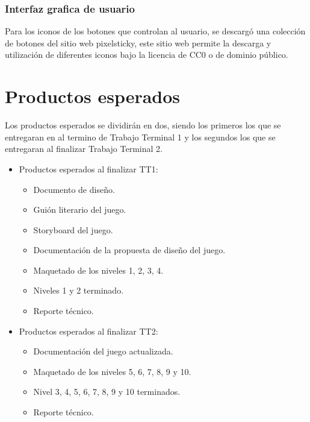 	\subsubsection{Interfaz grafica de usuario}
Para los iconos de los botones que controlan al usuario, se descargó una colección de botones del sitio web pixelsticky, este sitio web permite la descarga y utilización de diferentes iconos bajo la licencia de CC0 o de dominio público.

\section{Productos esperados}\label{Sec_Producto}
Los productos esperados se dividirán en dos, siendo los primeros los que se entregaran en al termino de Trabajo Terminal 1 y los segundos los que se entregaran al finalizar Trabajo Terminal 2.

\begin{itemize}
	\item Productos esperados al finalizar TT1:
		\begin{itemize}
			\item Documento de diseño.
			\item Guión literario del juego.
			\item Storyboard del juego.
			\item Documentación de la propuesta de diseño del juego.
			\item Maquetado de los niveles 1, 2, 3, 4.
			\item Niveles 1 y 2 terminado.
			\item Reporte técnico.
		\end{itemize}
	\item Productos esperados al finalizar TT2:
		\begin{itemize}
			\item Documentación del juego actualizada.
			\item Maquetado de los niveles 5, 6, 7, 8, 9 y 10.
			\item Nivel 3, 4, 5, 6, 7, 8, 9 y 10 terminados.
			\item Reporte técnico.
		\end{itemize}
\end{itemize}